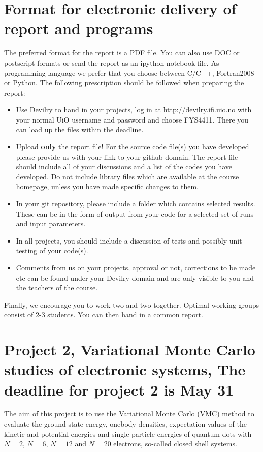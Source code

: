 \documentclass[10pt]{article}
\begin{document}
\section*{Format for electronic delivery of report and programs}
%
The preferred format for the report is a PDF file. You can also
use DOC or postscript formats or send the report as an ipython notebook file. 
As programming language we prefer that you choose between C/C++, Fortran2008 or Python.
The following prescription should be followed when preparing the report:
\begin{itemize}
\item Use Devilry to hand in your projects, log in  at \url{http://devilry.ifi.uio.no} with your normal UiO username and password
and choose FYS4411.
There you can load up the files within the deadline.
\item Upload {\bf only} the report file!  For the source code file(s) you have developed please provide us with your link to your github domain. 
The report file should include all of your discussions and a list of the codes you have developed. 
Do not include library files which are available at the course homepage, unless you have
made specific changes to them.
\item In your git repository, please include a folder which contains selected results. These can be in the form of output from your code
for a selected set of runs and input parameters. 
\item In all projects, you should include a discussion of tests and possibly unit testing of your code(s).
\item Comments  from us on your projects, approval or not, corrections to be made 
etc can be found under
your Devilry domain and are only visible to you and the teachers of the course.

\end{itemize}

Finally, 
we encourage you to work two and two together. Optimal working groups consist of 
2-3 students. You can then hand in a common report. 


\section*{Project 2, Variational Monte Carlo studies of electronic systems, The deadline for project 2 is May 31 }

The aim of this project is to use the Variational Monte
Carlo (VMC) method to evaluate 
the ground state energy, onebody densities, expectation values of the kinetic and potential energies 
 and single-particle energies of 
quantum dots with $N=2$, $N=6$, $N=12$ and $N=20$ electrons, so-called closed shell systems.
\end{document}
